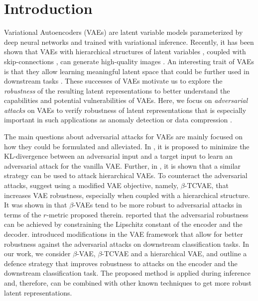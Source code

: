 \section{Introduction}\label{sec:intro}

Variational Autoencoders (VAEs) \citep{kingma2014autoencoding, rezende2014stochastic} are latent variable models parameterized by deep neural networks and trained with variational inference. Recently, it has been shown that VAEs with hierarchical structures of latent variables \citep{ranganath2016hierarchical}, coupled with skip-connections \citep{maaloe2019biva, So_nderby2016-en}, can generate high-quality images \citep{Child2020-ze, vahdat2020nvae}. An interesting trait of VAEs is that they allow learning meaningful latent space that could be further used in downstream tasks \citep{bengio2013representation, higgins2017darla}. These successes of VAEs motivate us to explore the \textit{robustness} of the resulting latent representations to better understand the capabilities and potential vulnerabilities of VAEs. Here, we focus on \textit{adversarial attacks} on VAEs to verify robustness of latent representations that is especially important in such applications as anomaly detection \citep{an2015variational, maaloe2019biva} or data compression \citep{balle2018variational, habibian2019video}. 

The main questions about adversarial attacks for VAEs are mainly focused on how they could be formulated and alleviated. In \citet{Gondim-Ribeiro2018-cu}, it is proposed to minimize the KL-divergence between an adversarial input and a target input to learn an adversarial attack for the vanilla VAE. Further, in \citet{kuzina2021adv}, it is shown that a similar strategy can be used to attack hierarchical VAEs. To counteract the adversarial attacks, \citet{Willetts2019-mu} suggest using a modified VAE objective, namely, $\beta$-TCVAE, that increases VAE robustness, especially when coupled with a hierarchical structure. It was shown in \citet{camuto2021towards} that $\beta$-VAEs tend to be more robust to adversarial attacks in terms of the $r$-metric proposed therein. \citet{barrett2021certifiably} reported that the adversarial robustness can be achieved by constraining the Lipschitz constant of the encoder and the decoder. \citet{cemgil2020autoencoding, Cemgil2019-vn} introduced modifications in the VAE framework that allow for better robustness against the adversarial attacks on downstream classification tasks. In our work, we consider $\beta$-VAE, $\beta$-TCVAE and a hierarchical VAE, and outline a defence strategy that improves robustness to attacks on the encoder and the downstream classification task. The proposed method is applied during inference and, therefore, can be combined with other known techniques to get more robust latent representations.


